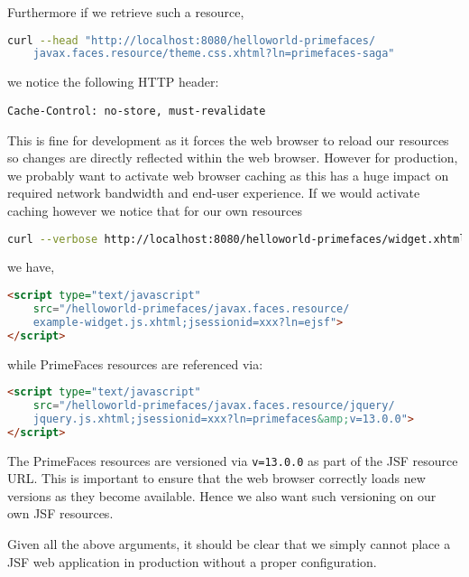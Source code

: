 Furthermore if we retrieve such a resource,
\begin{lstlisting}[language=bash]
curl --head "http://localhost:8080/helloworld-primefaces/
	javax.faces.resource/theme.css.xhtml?ln=primefaces-saga"
\end{lstlisting}
we notice the following HTTP header:
\begin{lstlisting}
Cache-Control: no-store, must-revalidate
\end{lstlisting}
This is fine for development as it forces the web browser to reload our resources so changes are directly reflected within the web browser.
However for production, we probably want to activate web browser caching as this has a huge impact on required network bandwidth and end-user experience.
If we would activate caching however we notice that for our own resources
\begin{lstlisting}[language=bash]
curl --verbose http://localhost:8080/helloworld-primefaces/widget.xhtml
\end{lstlisting}
we have,
\begin{lstlisting}[language=html]
<script type="text/javascript"
	src="/helloworld-primefaces/javax.faces.resource/
	example-widget.js.xhtml;jsessionid=xxx?ln=ejsf">
</script>
\end{lstlisting}
while PrimeFaces resources are referenced via:
\begin{lstlisting}[language=html]
<script type="text/javascript"
	src="/helloworld-primefaces/javax.faces.resource/jquery/
	jquery.js.xhtml;jsessionid=xxx?ln=primefaces&amp;v=13.0.0">
</script>
\end{lstlisting}
The PrimeFaces resources are versioned via \texttt{v=13.0.0} as part of the JSF resource URL.
This is important to ensure that the web browser correctly loads new versions as they become available.
Hence we also want such versioning on our own JSF resources.

Given all the above arguments, it should be clear that we simply cannot place a JSF web application in production without a proper configuration.

